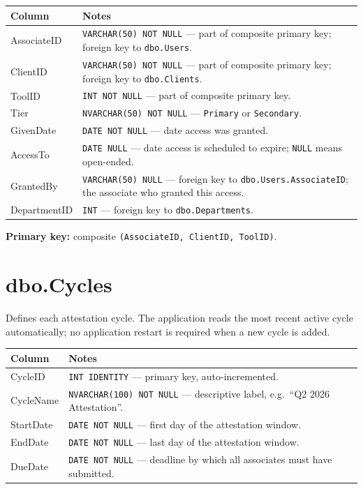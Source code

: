 \documentclass[12pt,a4paper]{report}
\begin{document}
\begin{longtable}{>{\ttfamily}p{4.5cm} >{\raggedright\arraybackslash}p{9.5cm}}
\toprule
\normalfont\textbf{Column} & \textbf{Notes} \\
\midrule
\endhead
AssociateID  & \texttt{VARCHAR(50) NOT NULL} — part of composite primary key;
               foreign key to \texttt{dbo.Users}. \\
ClientID     & \texttt{VARCHAR(50) NOT NULL} — part of composite primary key;
               foreign key to \texttt{dbo.Clients}. \\
ToolID       & \texttt{INT NOT NULL} — part of composite primary key. \\
Tier         & \texttt{NVARCHAR(50) NOT NULL} — \texttt{Primary} or \texttt{Secondary}. \\
GivenDate    & \texttt{DATE NOT NULL} — date access was granted. \\
AccessTo     & \texttt{DATE NULL} — date access is scheduled to expire; \texttt{NULL} means
               open-ended. \\
GrantedBy    & \texttt{VARCHAR(50) NULL} — foreign key to \texttt{dbo.Users.AssociateID};
               the associate who granted this access. \\
DepartmentID & \texttt{INT} — foreign key to \texttt{dbo.Departments}. \\
\bottomrule
\end{longtable}

\textbf{Primary key:} composite \texttt{(AssociateID, ClientID, ToolID)}.

\section{dbo.Cycles}

Defines each attestation cycle. The application reads the most recent active cycle
automatically; no application restart is required when a new cycle is added.

\begin{longtable}{>{\ttfamily}p{4.5cm} >{\raggedright\arraybackslash}p{9.5cm}}
\toprule
\normalfont\textbf{Column} & \textbf{Notes} \\
\midrule
\endhead
CycleID   & \texttt{INT IDENTITY} — primary key, auto-incremented. \\
CycleName & \texttt{NVARCHAR(100) NOT NULL} — descriptive label, e.g.\ ``Q2 2026 Attestation''. \\
StartDate & \texttt{DATE NOT NULL} — first day of the attestation window. \\
EndDate   & \texttt{DATE NOT NULL} — last day of the attestation window. \\
DueDate   & \texttt{DATE NOT NULL} — deadline by which all associates must have submitted. \\
\bottomrule
\end{longtable}
\end{document}
